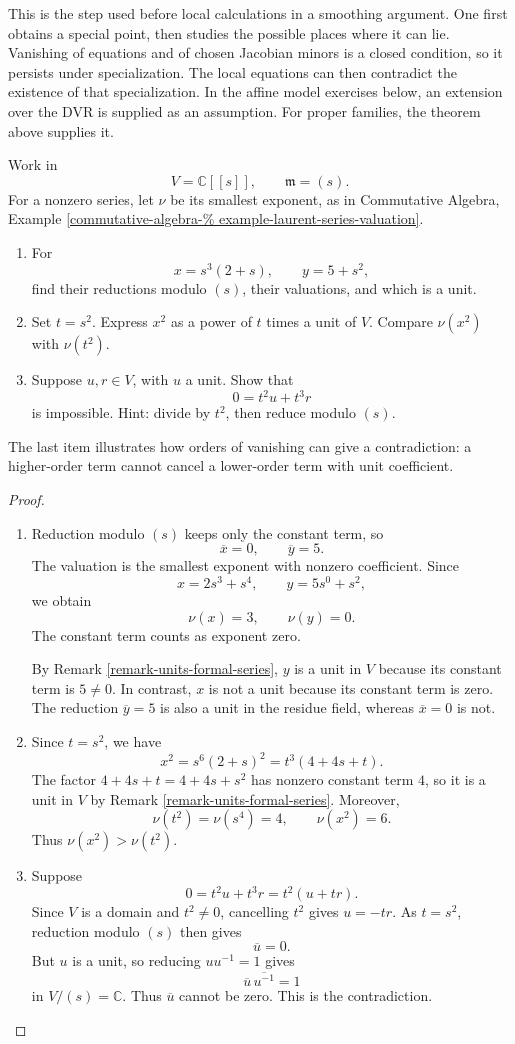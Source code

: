 This is the step used before local
calculations in a smoothing argument.
One first obtains a special point,
then studies the possible places where
it can lie.
Vanishing of equations and of chosen
Jacobian minors is a closed condition,
so it persists under specialization.
The local equations can then contradict
the existence of that specialization.
In the affine model exercises below,
an extension over the DVR is supplied
as an assumption.
For proper families, the theorem above
supplies it.

\begin{exercise}
\label{exercise-dvr-orders-contradiction}
Work in
$$
V=\mathbb{C}[[s]],\qquad
\mathfrak{m}=(s).
$$
For a nonzero series, let $\nu$ be its
smallest exponent, as in
Commutative Algebra, Example
\ref{commutative-algebra-%
example-laurent-series-valuation}.
\begin{enumerate}
\item For
$$
x=s^3(2+s),\qquad y=5+s^2,
$$
find their reductions modulo $(s)$,
their valuations, and which is a unit.
\item Set $t=s^2$. Express $x^2$ as
a power of $t$ times a unit of $V$.
Compare $\nu(x^2)$ with $\nu(t^2)$.
\item Suppose $u,r\in V$, with $u$
a unit. Show that
$$
0=t^2u+t^3r
$$
is impossible.
Hint: divide by $t^2$, then reduce
modulo $(s)$.
\end{enumerate}
The last item illustrates how orders
of vanishing can give a contradiction:
a higher-order term cannot cancel
a lower-order term with unit coefficient.
\end{exercise}

\begin{proof}
\begin{enumerate}
\item Reduction modulo $(s)$ keeps
only the constant term, so
$$
\overline{x}=0,\qquad \overline{y}=5.
$$
The valuation is the smallest exponent
with nonzero coefficient. Since
$$
x=2s^3+s^4,\qquad y=5s^0+s^2,
$$
we obtain
$$
\nu(x)=3,\qquad \nu(y)=0.
$$
The constant term counts as exponent
zero.

By Remark
\ref{remark-units-formal-series},
$y$ is a unit in $V$ because its
constant term is $5\neq0$.
In contrast, $x$ is not a unit because
its constant term is zero.
The reduction $\overline{y}=5$ is also
a unit in the residue field, whereas
$\overline{x}=0$ is not.
\item Since $t=s^2$, we have
$$
x^2=s^6(2+s)^2=t^3(4+4s+t).
$$
The factor $4+4s+t=4+4s+s^2$ has
nonzero constant term $4$, so it is
a unit in $V$ by Remark
\ref{remark-units-formal-series}.
Moreover,
$$
\nu(t^2)=\nu(s^4)=4,\qquad
\nu(x^2)=6.
$$
Thus $\nu(x^2)>\nu(t^2)$.
\item Suppose
$$
0=t^2u+t^3r=t^2(u+tr).
$$
Since $V$ is a domain and $t^2\neq0$,
cancelling $t^2$ gives $u=-tr$.
As $t=s^2$, reduction modulo $(s)$
then gives
$$
\overline{u}=0.
$$
But $u$ is a unit, so reducing
$uu^{-1}=1$ gives
$$
\overline{u}\,\overline{u^{-1}}=1
$$
in $V/(s)=\mathbb{C}$.
Thus $\overline{u}$ cannot be zero.
This is the contradiction.
\end{enumerate}
\end{proof}


